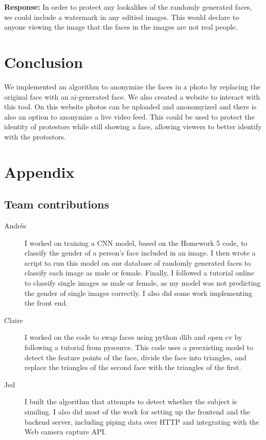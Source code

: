 \begin{enumerate}
    \textbf{Response:} In order to protect any lookalikes of the randomly generated faces, we could include a watermark in any editied images. This would declare to anyone viewing the image
    that the faces in the images are not real people.
\end{enumerate}




\section{Conclusion}

We implemented an algorithm to anonymize the faces in a photo by replacing the original face with an ai-generated face.
We also created a website to interact with this tool. On this website photos can be uploaded and anonomyized and there
is also an option to anonymize a live video feed. This could be used to protect the identity of
protestors while still showing a face, allowing viewers to better identify with the protestors. 

{\small


}

\section*{Appendix}

\subsection*{Team contributions}

\begin{description}
\item[Andrés] I worked on training a CNN model, based on the Homework 5 code, to classify the gender of a person's face included in an image. I then wrote a script to run this model on our database of randomly generated faces to classify each image as male or female. Finally, I followed a tutorial online to classify single images as male or female, as my model was not predicting the gender of single images correctly. I also did some work implementing the front end.
\item[Claire] I worked on the code to swap faces using python dlib and open cv by following a tutorial from pysource. This code uses a preexisting model to detect the feature points of the face, divide the face into triangles, and replace the triangles of the second face with the triangles of the first.
\item [Jed] I built the algorithm that attempts to detect whether the subject is similing. I also did most of the work for setting up the frontend and the backend server, including piping data over HTTP and integrating with the Web camera capture API.
\end{description}


